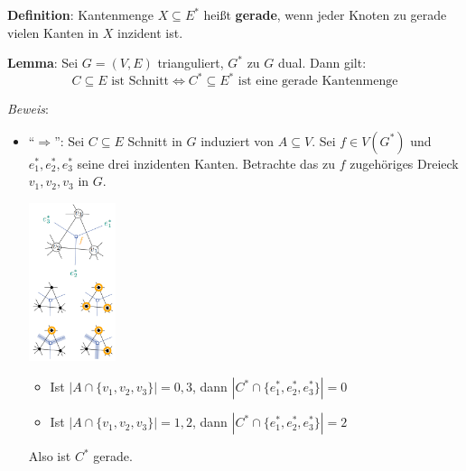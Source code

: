 \begin{enumerate}
	\textbf{Definition}: Kantenmenge $X\subseteq E^*$ heißt \textbf{gerade}, wenn jeder Knoten zu gerade vielen Kanten in $X$ inzident ist.
	
	\textbf{Lemma}: Sei $G = (V , E)$ trianguliert, $G^*$ zu $G$ dual. Dann gilt:
	$$C\subseteq E \text{ ist Schnitt} \iff C^*\subseteq E^* \text{ ist eine gerade Kantenmenge}$$
	
	\textit{Beweis}: 
	\begin{itemize}
		\item \enquote{$\Rightarrow$}: Sei $C\subseteq E$ Schnitt in $G$ induziert von $A\subseteq V$. Sei $f\in V(G^*)$ und $e_1^*,e_2^*,e_3^*$ seine drei inzidenten Kanten. Betrachte das zu $f$ zugehöriges Dreieck $v_1,v_2,v_3$ in $G$.
		\begin{center}
			\includegraphics[width=0.2\textwidth]{images/mmc-3.png}
		\end{center}
		\begin{itemize}
			\item Ist $|A\cap \{v_1,v_2,v_3\}|=0,3$, dann $|C^*\cap\{e_1^*,e_2^*,e_3^*\}|=0$
			\item Ist $|A\cap \{v_1,v_2,v_3\}|=1,2$, dann $|C^*\cap\{e_1^*,e_2^*,e_3^*\}|=2$
		\end{itemize}
		
		Also ist $C^*$ gerade.
		

\end{itemize}
\end{enumerate}
